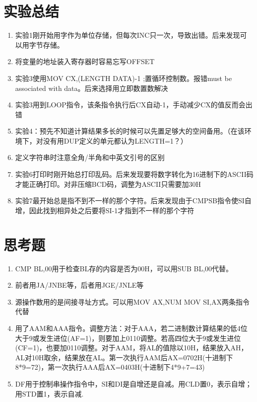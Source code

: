\documentclass[12pt, a4paper, oneside]{ctexart}
\begin{document}
\section{实验总结}
\begin{enumerate}
    \item 实验1刚开始用字作为单位存储，但每次INC只一次，导致出错。后来发现可以用字节存储。
    \item 将变量的地址装入寄存器时容易忘写OFFSET
    \item 实验3使用MOV CX,(LENGTH DATA)-1 ;置循环控制数。报错must be associated with data。后来选择用立即数置数解决
    \item 实验3用到LOOP指令，该条指令执行后CX自动-1，手动减少CX的值反而会出错
    \item 实验4：预先不知道计算结果多长的时候可以先置足够大的空间备用。（在该环境下，对没有用DUP定义的单元都认为LENGTH=1？）
    \item 定义字符串时注意全角/半角和中英文引号的区别
    \item 实验6打印时刚开始总打印乱码。后来发现要将数字转化为16进制下的ASCII码才能正确打印。对非压缩BCD码，调整为ASCII只需要加30H
    \item 实验7最开始总是指不到不一样的那个字符。后来发现由于CMPSB指令使SI自增，因此找到相异处之后要将SI-1才指到不一样的那个字符
\end{enumerate}
\section{思考题}
\begin{enumerate}
    \item CMP BL,00用于检查BL存的内容是否为00H，可以用SUB BL,00代替。
    \item 前者用JA/JNBE等，后者用JGE/JNLE等
    \item 源操作数用的是间接寻址方式。可以用MOV AX,NUM MOV SI,AX两条指令代替
    \item 用了AAM和AAA指令。调整方法：对于AAA，若二进制数计算结果的低4位大于9或发生进位(AF=1)，则要加上0110调整。若高四位大于9或发生进位(CF=1)，也要加0110调整。对于AAM，将AL的值除以10H，结果放入AH，AL对10H取余，结果放在AL。第一次执行AAM后AX=0702H(十进制下8*9=72)，第一次执行AAA后AX=0403H(十进制下4*9+7=43)
    \item DF用于控制串操作指令中，SI和DI是自增还是自减。用CLD置0，表示自增；用STD置1，表示自减.
\end{enumerate}
\end{document}
